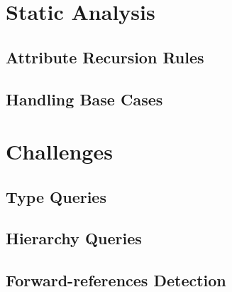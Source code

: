 \documentclass[12pt,letterpaper]{article}
\begin{document}


\section{Static Analysis}

\subsection{Attribute Recursion Rules}
\subsection{Handling Base Cases}


\section{Challenges}
\subsection{Type Queries}
\subsection{Hierarchy Queries}
\subsection{Forward-references Detection}
\end{document}
